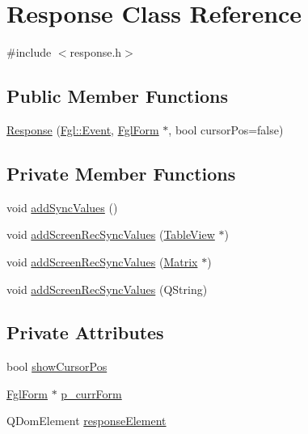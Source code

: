 \hypertarget{classResponse}{
\section{Response Class Reference}
\label{classResponse}
}


{\ttfamily \#include $<$response.h$>$}

\subsection*{Public Member Functions}
\begin{DoxyCompactItemize}
\item 
\hyperlink{classResponse_a0e0bf4f66117577315cca285dec94c20}{Response} (\hyperlink{structFgl_1_1Event}{Fgl::Event}, \hyperlink{classFglForm}{FglForm} $\ast$, bool cursorPos=false)
\end{DoxyCompactItemize}
\subsection*{Private Member Functions}
\begin{DoxyCompactItemize}
\item 
void \hyperlink{classResponse_ab76d71722c167fcf27f56403e63ab0d9}{addSyncValues} ()
\item 
void \hyperlink{classResponse_a31567b85abe887499b6b1be34975c296}{addScreenRecSyncValues} (\hyperlink{classTableView}{TableView} $\ast$)
\item 
void \hyperlink{classResponse_a94bffae67d84ecc39b939901380b2da2}{addScreenRecSyncValues} (\hyperlink{classMatrix}{Matrix} $\ast$)
\item 
void \hyperlink{classResponse_aac8433058bc5db31c052fccb7b5c32ea}{addScreenRecSyncValues} (QString)
\end{DoxyCompactItemize}
\subsection*{Private Attributes}
\begin{DoxyCompactItemize}
\item 
bool \hyperlink{classResponse_a170cc6ae7b4ad90d0c16fcdb6845415e}{showCursorPos}
\item 
\hyperlink{classFglForm}{FglForm} $\ast$ \hyperlink{classResponse_a19e3d7596e4d1a3b2af194d8e543e988}{p\_\-currForm}
\item 
QDomElement \hyperlink{classResponse_a3c59e49d41a393ac663a472135dc899a}{responseElement}
\end{DoxyCompactItemize}


